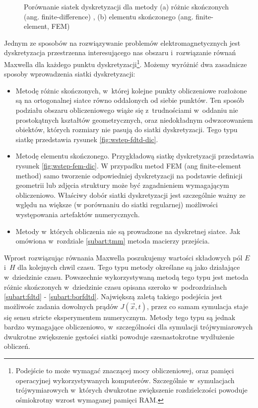 \begin{figure}[tb]
\begin{subfigure}{0.45\textwidth}
	\end{subfigure}
	\caption{Porównanie siatek dyskretyzacji dla metody (a) różnic skończonych (ang. finite-difference) , (b) elementu skończonego (ang. finite-element, FEM)}
\end{figure}

Jednym ze sposobów na rozwiązywanie problemów elektromagnetycznych jest dyskretyzacja przestrzenna interesującego nas obszaru i~rozwiązanie równań Maxwella dla każdego punktu dyskretyzacji\footnote{Podejście to może wymagać znaczącej mocy obliczeniowej, oraz pamięci operacyjnej wykorzystywanych komputerów. Szczególnie w~symulacjach trójwymiarowych w~których dwukrotne zwiększenie rozdzielczości powoduje ośmiokrotny wzrost wymaganej pamięci RAM. }. Możemy wyróżnić dwa zasadnicze sposoby wprowadzenia siatki dyskretyzacji:
\begin{itemize}
\item Metodę różnic skończonych, w~której kolejne punkty obliczeniowe rozłożone są na ortogonalnej siatce równo oddalonych od siebie punktów. Ten sposób podziału obszaru obliczeniowego wiąże się z~trudnościami w~oddaniu nie prostokątnych kształtów geometrycznych, oraz niedokładnym odwzorowaniem obiektów, których rozmiary nie pasują do siatki dyskretyzacji. Tego typu siatkę przedstawia rysunek \ref{fig:wstep-fdtd-dic}.
\item Metodę elementu skończonego. Przygkładową siatkę dyskretyzacji przedstawia rysunek \ref{fig:wstep-fem-dic}. W przypadku metod  FEM (ang finite-element method) samo tworzenie odpowiedniej dyskretyzacji na podstawie definicji geometrii lub zdjęcia struktury może być zagadnieniem wymagającym obliczeniowo. Właściwy dobór siatki dyskretyzacji jest szczególnie ważny ze wględu na większe (w porównaniu do siatki regularnej) możliwości występowania artefaktów numerycznych.  
\item Metody w~których obliczenia nie są prowadzone na dyskretnej siatce. Jak omówiona w~rozdziale \ref{subart:tmm} metoda macierzy przejścia.
\end{itemize}

Wprost rozwiązując równania Maxwella poszukujemy wartości składowych pól $E$ i~$H$ dla kolejnych chwil czasu. Tego typu metody określane są jako działające w~dziedzinie czasu. Powszechnie wykorzystywaną metodą tego typu jest metoda różnic skończonych w~dziedzinie czasu opisana szeroko w~podrozdziałach \ref{subart:fdtd} - \ref{subart:borfdtd}. Największą zaletą takiego podejścia jest możliwośc zadania dowolnych prądów $J(\vec{x},t)$, przez co samam symulacja staje się sensu stricte eksperymentem numerycznym. Metody tego typu są jednak bardzo wymagające obliczeniowo, w~szczególności dla symulacji trójwymiarowych dwukrotne zwiększenie gęstości siatki powoduje szesnastokrotne wydłużenie obliczeń. 

